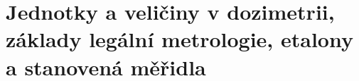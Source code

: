 \section[Jednotky a veličiny v dozimetrii]{Jednotky a veličiny v dozimetrii, základy legální metrologie, etalony a stanovená měřidla}


